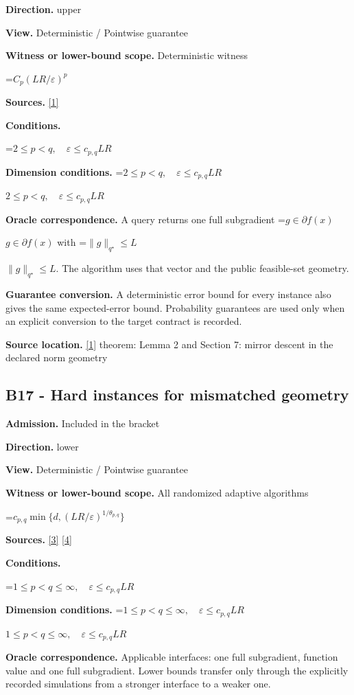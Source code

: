 \documentclass[10pt,a4paper]{article}
\newcommand{\AtlasMath}[1]{\par\begingroup\centering\setbox0=\hbox{$\displaystyle #1$}\ifdim\wd0>1.4\linewidth\typeout{ATLAS WIDE FORMULA: \the\wd0}\fi\ifdim\wd0>\linewidth\resizebox{\linewidth}{!}{\box0}\else\box0\fi\par\endgroup}
\newcommand{\AtlasInlineMath}[1]{\begingroup\setbox0=\hbox{$#1$}\ifdim\wd0>.4\linewidth\endgroup\AtlasMath{#1}\else\endgroup$#1$\fi}
\begin{document}
\textbf{Direction.} upper

\textbf{View.} Deterministic / Pointwise guarantee

\textbf{Witness or lower-bound scope.} Deterministic witness

\AtlasMath{C_p(LR/\varepsilon)^p}
\textbf{Sources.} \href{https://arxiv.org/pdf/1107.4080}{[1]}

\textbf{Conditions.} 
\AtlasMath{2\le p<q,\quad\varepsilon\le c_{p,q}LR}


\textbf{Dimension conditions.} \AtlasInlineMath{2\le p<q,\quad\varepsilon\le c_{p,q}LR}

\textbf{Oracle correspondence.} A query returns one full subgradient \AtlasInlineMath{g\in\partial f(x)} with \AtlasInlineMath{\|g\|_{q^\star}\le L}. The algorithm uses that vector and the public feasible-set geometry.

\textbf{Guarantee conversion.} A deterministic error bound for every instance also gives the same expected-error bound. Probability guarantees are used only when an explicit conversion to the target contract is recorded.

\textbf{Source location.} \href{https://arxiv.org/pdf/1107.4080}{[1]} theorem: Lemma 2 and Section 7: mirror descent in the declared norm geometry

\subsection{B17 - Hard instances for mismatched geometry}
\textbf{Admission.} Included in the bracket

\textbf{Direction.} lower

\textbf{View.} Deterministic / Pointwise guarantee

\textbf{Witness or lower-bound scope.} All randomized adaptive algorithms

\AtlasMath{c_{p,q}\min\{d,(LR/\varepsilon)^{1/\theta_{p,q}}\}}
\textbf{Sources.} \href{https://arxiv.org/pdf/2609.20701}{[3]} \href{https://arxiv.org/pdf/2609.20687}{[4]}

\textbf{Conditions.} 
\AtlasMath{1\le p<q\le\infty,\quad\varepsilon\le c_{p,q}LR}


\textbf{Dimension conditions.} \AtlasInlineMath{1\le p<q\le\infty,\quad\varepsilon\le c_{p,q}LR}

\textbf{Oracle correspondence.} Applicable interfaces: one full subgradient, function value and one full subgradient. Lower bounds transfer only through the explicitly recorded simulations from a stronger interface to a weaker one.
\end{document}
